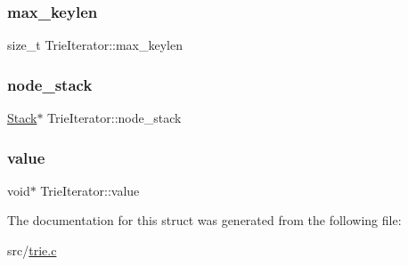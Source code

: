 \mbox{\label{structTrieIterator_abdeaac0e322f45e7b8d0e5f3dc0eeb20}} 
\subsubsection{\texorpdfstring{max\_keylen}{max\_keylen}}
{\footnotesize\ttfamily size\+\_\+t Trie\+Iterator\+::max\+\_\+keylen}

\mbox{\label{structTrieIterator_a7371ff311cb4d122b327db7d36a853b6}} 
\subsubsection{\texorpdfstring{node\_stack}{node\_stack}}
{\footnotesize\ttfamily \mbox{\hyperlink{stack_8h_aa7883e8bf747b9dedec990b539df2cc0}{Stack}}$\ast$ Trie\+Iterator\+::node\+\_\+stack}

\mbox{\label{structTrieIterator_a9b38eada0f43079f0a6b51e01eedfb8b}} 
\subsubsection{\texorpdfstring{value}{value}}
{\footnotesize\ttfamily void$\ast$ Trie\+Iterator\+::value}



The documentation for this struct was generated from the following file\+:\begin{DoxyCompactItemize}
\item 
src/\mbox{\hyperlink{trie_8c}{trie.\+c}}\end{DoxyCompactItemize}
